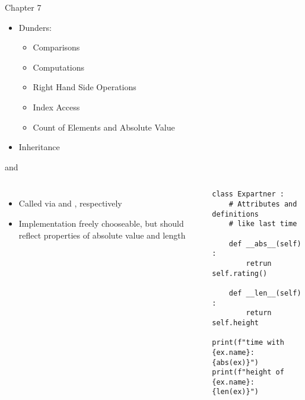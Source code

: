 
\begin{frame}[t,plain]
\titlepage
\end{frame}


\begin{frame}[fragile]{Chapter 7}
%
\begin{itemize}
\item Dunders: 
	\begin{itemize}
	\item Comparisons
	\item Computations
	\item Right Hand Side Operations
	\item Index Access
	\item Count of Elements and Absolute Value
	\end{itemize}
\item Inheritance
\end{itemize}
%
\end{frame}


\begin{frame}[fragile]{ and }
%
\begin{columns}[T]
\begin{itemize}
\item Called via  and , respectively
\item Implementation freely chooseable, but should reflect properties of absolute value and length
\end{itemize}
%
\begin{codebox}
\begin{verbatim}
class Expartner :
    # Attributes and definitions
    # like last time
    
    def __abs__(self) :
        retrun self.rating()
    
    def __len__(self) :
        return self.height

print(f"time with {ex.name}: {abs(ex)}")
print(f"height of {ex.name}: {len(ex)}")
\end{verbatim}
\end{codebox}
\end{columns}
%
\end{frame}

